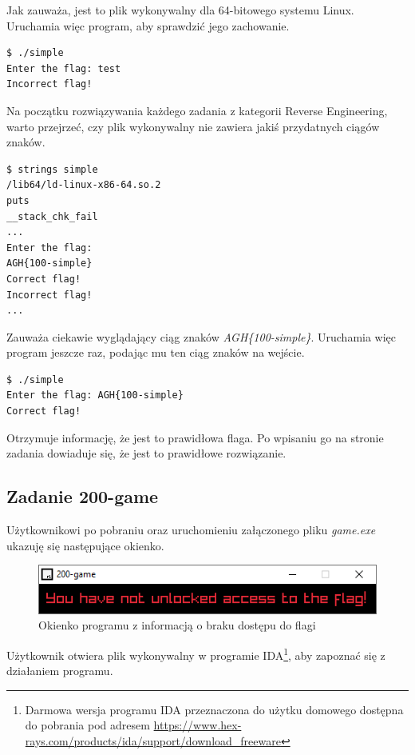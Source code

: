 \documentclass[polish,12pt]{aghthesis}
\begin{document}
Jak zauważa, jest to plik wykonywalny dla 64-bitowego systemu Linux.
Uruchamia więc program, aby sprawdzić jego zachowanie.

\begin{verbatim}
$ ./simple
Enter the flag: test
Incorrect flag!
\end{verbatim}

Na początku rozwiązywania każdego zadania z kategorii Reverse Engineering, warto
przejrzeć, czy plik wykonywalny nie zawiera jakiś przydatnych ciągów znaków.

\begin{verbatim}
$ strings simple
/lib64/ld-linux-x86-64.so.2
puts
__stack_chk_fail
...
Enter the flag: 
AGH{100-simple}
Correct flag!
Incorrect flag!
...
\end{verbatim}

Zauważa ciekawie wyglądający ciąg znaków \emph{AGH\{100-simple\}}.
Uruchamia więc program jeszcze raz, podając mu ten ciąg znaków na wejście.

\begin{verbatim}
$ ./simple
Enter the flag: AGH{100-simple}
Correct flag!
\end{verbatim}

Otrzymuje informację, że jest to prawidłowa flaga.
Po wpisaniu go na stronie zadania dowiaduje się, że jest to prawidłowe rozwiązanie.

\subsection{Zadanie 200-game}

Użytkownikowi po pobraniu oraz uruchomieniu załączonego pliku \emph{game.exe} ukazuję
się następujące okienko.

\begin{figure}[H]
    \centering
    \includegraphics{200_not_unlocked}
    \caption{Okienko programu z informacją o braku dostępu do flagi}
    \label{fig:200_not_unlocked}
\end{figure}

Użytkownik otwiera plik wykonywalny w programie IDA\footnote{
Darmowa wersja programu IDA przeznaczona do użytku domowego dostępna do pobrania pod adresem 
\url{https://www.hex-rays.com/products/ida/support/download_freeware}},
aby zapoznać się z działaniem programu.
\end{document}
